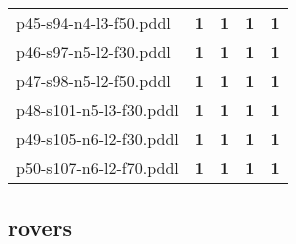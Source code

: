 \documentclass{article}
\begin{document}
\begin{tabular}{@{}lrrrr@{}}
p45-s94-n4-l3-f50.pddl & \textbf{1} & \textbf{1} & \textbf{1} & \textbf{1} \\
p46-s97-n5-l2-f30.pddl & \textbf{1} & \textbf{1} & \textbf{1} & \textbf{1} \\
p47-s98-n5-l2-f50.pddl & \textbf{1} & \textbf{1} & \textbf{1} & \textbf{1} \\
p48-s101-n5-l3-f30.pddl & \textbf{1} & \textbf{1} & \textbf{1} & \textbf{1} \\
p49-s105-n6-l2-f30.pddl & \textbf{1} & \textbf{1} & \textbf{1} & \textbf{1} \\
p50-s107-n6-l2-f70.pddl & \textbf{1} & \textbf{1} & \textbf{1} & \textbf{1} \\
\end{tabular}

\hypertarget{coverage-rovers}{}
\subsection*{rovers}
\end{document}
